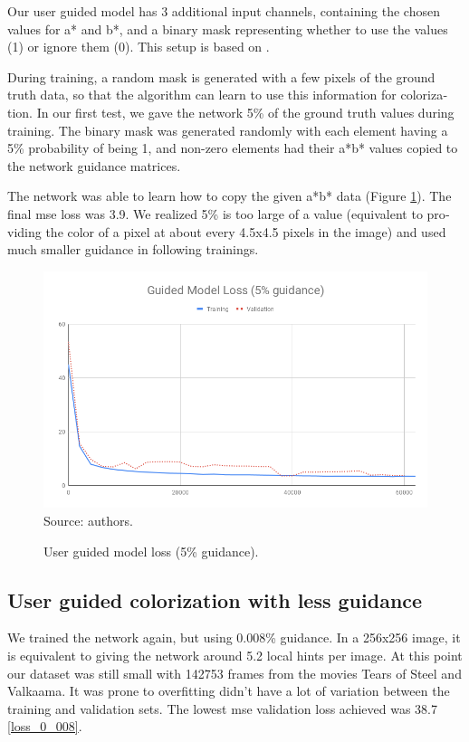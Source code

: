 \documentclass[12pt,openright,oneside,a4paper,english, brazilian]{abntex2}
\begin{document}
\begin{otherlanguage}{english}
Our user guided model has 3 additional input channels, containing the chosen values for a* and b*, and a binary mask representing whether to use the values (1) or ignore them (0). This setup is based on \cite{Zhang2017}.

During training, a random mask is generated with a few pixels of the ground truth data, so that the algorithm can learn to use this information for colorization. In our first test, we gave the network 5\% of the ground truth values during training. The binary mask was generated randomly with each element having a 5\% probability of being 1, and non-zero elements had their a*b* values copied to the network guidance matrices.

The network was able to learn how to copy the given a*b* data (Figure \ref{loss_5}). The final \acrshort{mse} loss was 3.9. We realized 5\% is too large of a value (equivalent to providing the color of a pixel at about every 4.5x4.5 pixels in the image) and used much smaller guidance in following trainings.

\begin{figure}[!htb]
\centering
\caption{User guided model loss (5\% guidance).}
\includegraphics[width=\textwidth]{loss/Guided_5}
Source: authors.
\label{loss_5}
\end{figure}

\subsection{User guided colorization with less guidance}

We trained the network again, but using 0.008\% guidance. In a 256x256 image, it is equivalent to giving the network around 5.2 local hints per image. At this point our dataset was still small with 142753 frames from the movies Tears of Steel and Valkaama. It was prone to overfitting didn't have a lot of variation between the training and validation sets. The lowest \acrshort{mse} validation loss achieved  was 38.7 \ref{loss_0_008}.


\end{otherlanguage}
\end{document}
